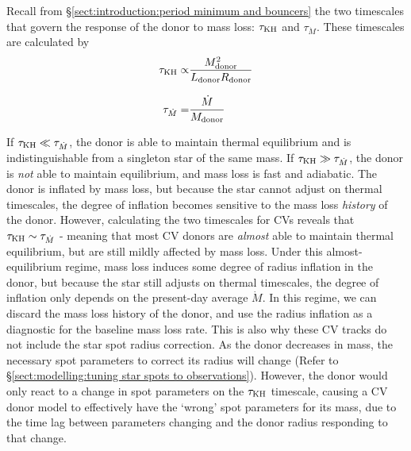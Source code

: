 Recall from \S\ref{sect:introduction:period minimum and bouncers} the two timescales that govern the response of the donor to mass loss: $\tau_{\rm KH}$ and $\tau_{\dot M}$. These timescales are calculated by
\begin{align}
    \tau_{\rm KH} \propto& \frac{M_{\rm donor}^2}{L_{\rm donor} R_{\rm donor}} \\[8pt]
    \tau_{\dot M} =& \frac{\dot M}{M_{\rm donor}}
\end{align}

If $\tau_{\rm KH} \ll \tau_{\dot M}$, the donor is able to maintain thermal equilibrium and is indistinguishable from a singleton star of the same mass.
If $\tau_{\rm KH} \gg \tau_{\dot M}$, the donor is \textit{not} able to maintain equilibrium, and mass loss is fast and adiabatic. The donor is inflated by mass loss, but because the star cannot adjust on thermal timescales, the degree of inflation becomes sensitive to the mass loss \textit{history} of the donor.
However, calculating the two timescales for CVs reveals that $\tau_{\rm KH} \sim \tau_{\dot M}$ \citep{knigge11} - meaning that most CV donors are \textit{almost} able to maintain thermal equilibrium, but are still mildly affected by mass loss.
Under this almost-equilibrium regime, mass loss induces some degree of radius inflation in the donor, but because the star still adjusts on thermal timescales, the degree of inflation only depends on the present-day average $\dot M$. In this regime, we can discard the mass loss history of the donor, and use the radius inflation as a diagnostic for the baseline mass loss rate.
This is also why these CV tracks do not include the star spot radius correction. As the donor decreases in mass, the necessary spot parameters to correct its radius will change (Refer to \S\ref{sect:modelling:tuning star spots to observations}). However, the donor would only react to a change in spot parameters on the $\tau_{\rm KH}$ timescale, causing a CV donor model to effectively have the `wrong' spot parameters for its mass, due to the time lag between parameters changing and the donor radius responding to that change.


